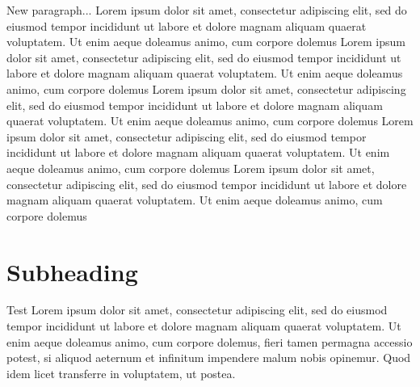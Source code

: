 \documentclass[
	ngerman,
	ruledheaders=section,%
	class=report,%
	thesis={type=bachelor},%
	accentcolor=9c,%
	custommargins=true,%
	marginpar=false,%
	parskip=half-,%
	fontsize=11pt,%
]{tudapub}
\begin{document}
New paragraph...
Lorem ipsum dolor sit amet, consectetur adipiscing elit, sed do eiusmod tempor incididunt ut labore et dolore magnam aliquam quaerat voluptatem. Ut enim aeque doleamus animo, cum corpore dolemus
Lorem ipsum dolor sit amet, consectetur adipiscing elit, sed do eiusmod tempor incididunt ut labore et dolore magnam aliquam quaerat voluptatem. Ut enim aeque doleamus animo, cum corpore dolemus
Lorem ipsum dolor sit amet, consectetur adipiscing elit, sed do eiusmod tempor incididunt ut labore et dolore magnam aliquam quaerat voluptatem. Ut enim aeque doleamus animo, cum corpore dolemus
Lorem ipsum dolor sit amet, consectetur adipiscing elit, sed do eiusmod tempor incididunt ut labore et dolore magnam aliquam quaerat voluptatem. Ut enim aeque doleamus animo, cum corpore dolemus
Lorem ipsum dolor sit amet, consectetur adipiscing elit, sed do eiusmod tempor incididunt ut labore et dolore magnam aliquam quaerat voluptatem. Ut enim aeque doleamus animo, cum corpore dolemus




\section{Subheading}
Test Lorem ipsum dolor sit amet, consectetur adipiscing elit, sed do eiusmod tempor
incididunt ut labore et dolore magnam aliquam quaerat voluptatem. Ut enim aeque
doleamus animo, cum corpore dolemus, fieri tamen permagna accessio potest, si aliquod
aeternum et infinitum impendere malum nobis opinemur. Quod idem licet transferre in
voluptatem, ut postea.

\pagebreak

\printbibliography
\end{document}
